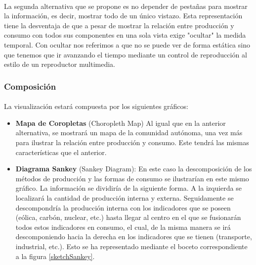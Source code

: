 \documentclass[11pt,spanish]{article}
\begin{document}
				\paragraph{}
				La segunda alternativa que se propone es no depender de pestañas para mostrar la información, es decir, mostrar todo de un único vistazo. Esta representación tiene la desventaja de que a pesar de mostrar la relación entre producción y consumo con todos sus componentes en una sola vista exige "ocultar" la medida temporal. Con ocultar nos referimos a que no se puede ver de forma estática sino que tenemos que ir avanzando el tiempo mediante un control de reproducción al estilo de un reproductor multimedia.
							
			\subsubsection{Composición}
			
				\paragraph{}
				La visualización estará compuesta por los siguientes gráficos:
				
				\begin{itemize}
					
					\item  {\bf Mapa de Coropletas }(Choropleth Map) Al igual que en la anterior alternativa, se mostrará un mapa de la comunidad autónoma, una vez más para ilustrar la relación entre producción y consumo. Este tendrá las mismas características que el anterior.
					
					\item  {\bf Diagrama  Sankey }(Sankey Diagram): En este caso la descomposición de los métodos de producción y las formas de consumo se ilustrarían en este mismo gráfico. La información se dividiría de la siguiente forma. A la izquierda se localizará la cantidad de producción interna y externa. Seguidamente se descompondría la producción interna con los indicadores que se poseen (eólica, carbón, nuclear, etc.) hasta llegar al centro en el que se fusionarán todos estos indicadores en consumo, el cual, de la misma manera se irá descomponiendo hacia la derecha en los indicadores que se tienen (transporte, industrial, etc.). Esto se ha representado mediante el  boceto  correspondiente a la figura \ref{sketchSankey}.
							
				\end{itemize}
				
\end{document}
